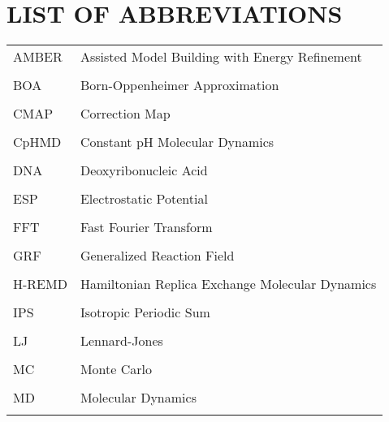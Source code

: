 
\chapter*{LIST OF ABBREVIATIONS}

\singlespacing

\begin{tabular}{lp{5in}}

AMBER & Assisted Model Building with Energy Refinement \\ \\

BOA & Born-Oppenheimer Approximation \\ \\

CMAP & Correction Map \\ \\ 

CpHMD & Constant pH Molecular Dynamics \\ \\

DNA & Deoxyribonucleic Acid \\ \\

ESP & Electrostatic Potential \\ \\

FFT & Fast Fourier Transform \\ \\

GRF & Generalized Reaction Field \\ \\

H-REMD & Hamiltonian Replica Exchange Molecular Dynamics \\ \\

IPS & Isotropic Periodic Sum \\ \\

LJ & Lennard-Jones \\ \\

MC & Monte Carlo \\ \\

MD & Molecular Dynamics \\ \\


\end{tabular}
